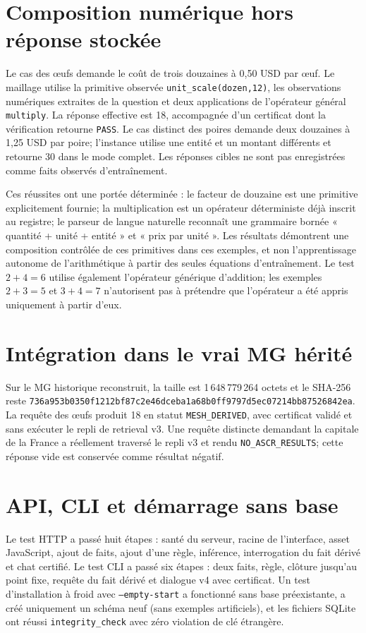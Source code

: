 \documentclass[11pt,a4paper]{book}
\begin{document}
\section{Composition numérique hors réponse stockée}
Le cas des œufs demande le coût de trois douzaines à 0,50 USD par œuf. Le maillage utilise la primitive observée \texttt{unit\_scale(dozen,12)}, les observations numériques extraites de la question et deux applications de l'opérateur général \texttt{multiply}. La réponse effective est 18, accompagnée d'un certificat dont la vérification retourne \texttt{PASS}. Le cas distinct des poires demande deux douzaines à 1,25 USD par poire; l'instance utilise une entité et un montant différents et retourne 30 dans le mode complet. Les réponses cibles ne sont pas enregistrées comme faits observés d'entraînement.

Ces réussites ont une portée déterminée : le facteur de douzaine est une primitive explicitement fournie; la multiplication est un opérateur déterministe déjà inscrit au registre; le parseur de langue naturelle reconnaît une grammaire bornée « quantité + unité + entité » et « prix par unité ». Les résultats démontrent une composition contrôlée de ces primitives dans ces exemples, et non l'apprentissage autonome de l'arithmétique à partir des seules équations d'entraînement. Le test $2+4=6$ utilise également l'opérateur générique d'addition; les exemples $2+3=5$ et $3+4=7$ n'autorisent pas à prétendre que l'opérateur a été appris uniquement à partir d'eux.

\section{Intégration dans le vrai MG hérité}
Sur le MG historique reconstruit, la taille est 1\,648\,779\,264 octets et le SHA-256 reste \texttt{736a953b0350f121\allowbreak{}2bf87c2e46dceba1\allowbreak{}a68b0ff9797d5ec0\allowbreak{}7214bb87526842ea}. La requête des œufs produit 18 en statut \texttt{MESH\_DERIVED}, avec certificat validé et sans exécuter le repli de retrieval v3. Une requête distincte demandant la capitale de la France a réellement traversé le repli v3 et rendu \texttt{NO\_ASCR\_RESULTS}; cette réponse vide est conservée comme résultat négatif.

\section{API, CLI et démarrage sans base}
Le test HTTP a passé huit étapes : santé du serveur, racine de l'interface, asset JavaScript, ajout de faits, ajout d'une règle, inférence, interrogation du fait dérivé et chat certifié. Le test CLI a passé six étapes : deux faits, règle, clôture jusqu'au point fixe, requête du fait dérivé et dialogue v4 avec certificat. Un test d'installation à froid avec \texttt{--empty-start} a fonctionné sans base préexistante, a créé uniquement un schéma neuf (sans exemples artificiels), et les fichiers SQLite ont réussi \texttt{integrity\_check} avec zéro violation de clé étrangère.
\end{document}
